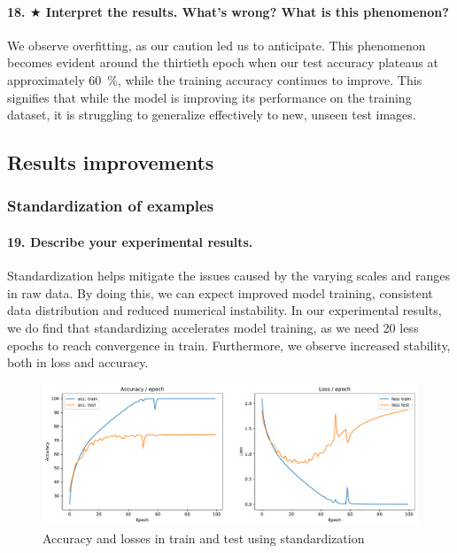 \documentclass{article}
\theoremstyle{plain}%
\theoremstyle{definition}
\theoremstyle{remark}
\begin{document}

\paragraph{18. $ \bigstar $ Interpret the results. What's wrong? What is this phenomenon?}
We observe overfitting, as our caution led us to anticipate. This phenomenon becomes evident around the thirtieth epoch when our test accuracy plateaus at approximately 60~\%, while the training accuracy continues to improve. This signifies that while the model is improving its performance on the training dataset, it is struggling to generalize effectively to new, unseen test images.

\subsection{Results improvements}
\subsubsection{Standardization of examples}
\paragraph{19. Describe your experimental results.}

Standardization helps mitigate the issues caused by the varying scales and ranges in raw data. By doing this, we can expect improved model training, consistent data distribution and reduced numerical instability. In our experimental results, we do find that standardizing accelerates model training, as we need 20 less epochs to reach convergence in train. Furthermore, we observe increased stability, both in loss and accuracy.

\begin{figure}[H]
    \centering
    \includegraphics*[width=\textwidth]{figs/CNN/standardization.pdf}
    \caption{Accuracy and losses in train and test using standardization}
    \label{fig:standardization}
\end{figure}
\end{document}
